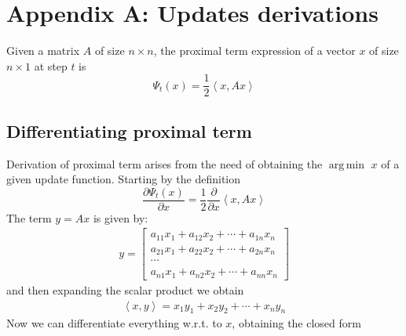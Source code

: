 \documentclass[notitlepage]{article}
\DeclareMathOperator*{\argmin}{arg\,min}
\begin{document}
\restoregeometry

\newpage




\newpage

\appendix

\section{Appendix A: Updates derivations}
\label{sec:appendix}
Given a matrix $A$ of size $n \times n$, the proximal term expression of a vector $x$ of size $n\times 1$ at step $t$ is
\[
  \Psi_t(x) = \frac{1}{2} \left\langle x, A x \right\rangle  
\]

\subsection{Differentiating proximal term}
Derivation of proximal term arises from the need of obtaining the $\argmin$ $x$ of a given update function. Starting by the definition
\[
  \frac{\partial \Psi_t(x)}{\partial x} = \frac{1}{2} \frac{\partial}{\partial x} \left\langle x, A x \right\rangle  
\]
The term $y = A x$ is given by:
\begin{align*}
  y = 
  \begin{bmatrix}
    a_{11}x_1 + a_{12}x_2 + \cdots + a_{1n}x_n \\[2ex]
    a_{21}x_1 + a_{22}x_2 + \cdots + a_{2n}x_n \\[2ex]
    \cdots \\
    a_{n1}x_1 + a_{n2}x_2 + \cdots + a_{nn}x_n 
  \end{bmatrix}
\end{align*}
and then expanding the scalar product we obtain
\begin{align*}
  \left\langle x,y \right\rangle = x_1 y_1 + x_2 y_2 + \cdots + x_n y_n
\end{align*}
Now we can differentiate everything w.r.t. to $x$, obtaining the closed form
\end{document}
